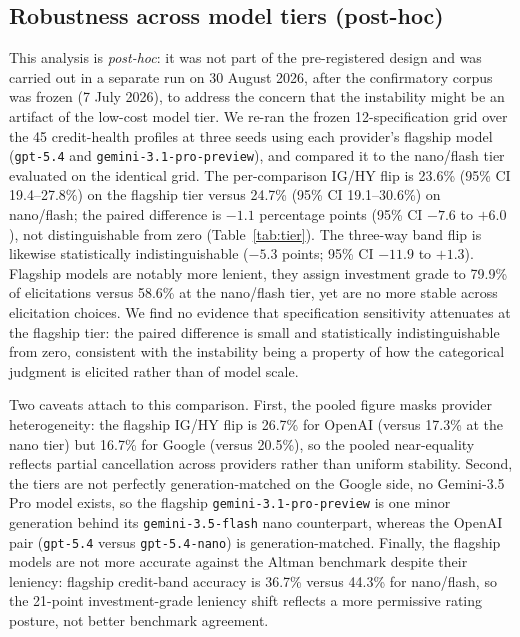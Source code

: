 \documentclass[a4paper,fleqn]{cas-sc}
\begin{document}
\subsection{Robustness across model tiers (post-hoc)}\label{sec:tier}
This analysis is \emph{post-hoc}: it was not part of the pre-registered design and was carried out in a
separate run on 30 August 2026, after the confirmatory corpus was frozen (7 July 2026), to address the
concern that the instability might be an artifact of the low-cost model tier. We re-ran the frozen
12-specification grid over the 45 credit-health profiles at three seeds using each provider's flagship
model (\texttt{gpt-5.4} and \texttt{gemini-3.1-pro-preview}), and compared it to the nano/flash tier
evaluated on the identical grid. The per-comparison IG/HY flip is 23.6\%
(95\% CI 19.4--27.8\%) on the flagship tier versus 24.7\% (95\% CI 19.1--30.6\%) on nano/flash; the
paired difference is $-1.1$ percentage points (95\% CI $-7.6$ to $+6.0$), not distinguishable from zero
(Table~\ref{tab:tier}). The three-way band flip is likewise statistically indistinguishable
($-5.3$ points; 95\% CI $-11.9$ to $+1.3$). Flagship models are notably more lenient, they assign
investment grade to 79.9\% of elicitations versus 58.6\% at the nano/flash tier, yet are no more
stable across elicitation choices. We find no evidence that specification sensitivity attenuates at the
flagship tier: the paired difference is small and statistically indistinguishable from zero, consistent
with the instability being a property of how the categorical judgment is elicited rather than of model
scale.

Two caveats attach to this comparison. First, the pooled figure masks provider heterogeneity: the
flagship IG/HY flip is 26.7\% for OpenAI (versus 17.3\% at the nano tier) but 16.7\% for Google (versus
20.5\%), so the pooled near-equality reflects partial cancellation across providers rather than uniform
stability. Second, the tiers are not perfectly generation-matched on the Google side, no Gemini-3.5 Pro
model exists, so the flagship \texttt{gemini-3.1-pro-preview} is one minor generation behind its
\texttt{gemini-3.5-flash} nano counterpart, whereas the OpenAI pair (\texttt{gpt-5.4} versus
\texttt{gpt-5.4-nano}) is generation-matched. Finally, the flagship models are not more accurate against
the Altman benchmark despite their leniency: flagship credit-band accuracy is 36.7\% versus 44.3\% for
nano/flash, so the 21-point investment-grade leniency shift reflects a more permissive rating posture,
not better benchmark agreement.
\end{document}
